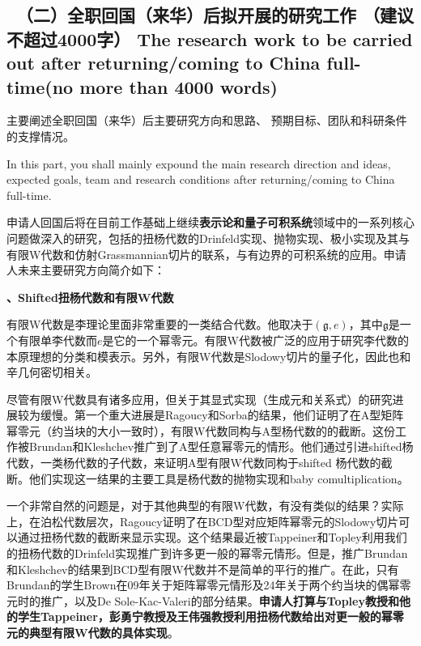 \documentclass[12pt,UTF8,AutoFakeBold=4,a4paper]{ctexart}
\begin{document}
{\color{MsBlue} \subsection{\sihao \kaishu \qquad \ 
\textbf{（二）全职回国（来华）后拟开展的研究工作} {\normalfont（建议不超过4000字）} 
\bfseries \xiaosihao {} 
The research work to 
be carried out after returning/coming to China full-time(no more than 4000 words)} 
}

 

{\sihao \color{MsBlue} \kaishu 主要阐述全职回国（来华）后主要研究方向和思路、
预期目标、团队和科研条件的支撑情况。}

\medskip

{\color{MsBlue}  
In this part, you shall mainly expound the main research direction and ideas, 
expected goals, team and research conditions after returning/coming to China 
full-time.}

\medskip

申请人回国后将在目前工作基础上继续\textbf{表示论和量子可积系统}领域中的一系列核心问题做深入的研究，包括的扭杨代数的Drinfeld实现、抛物实现、极小实现及其与有限W代数和仿射Grassmannian切片的联系，与有边界的可积系统的应用。申请人未来主要研究方向简介如下：

\textbf{、Shifted扭杨代数和有限W代数}

有限W代数是李理论里面非常重要的一类结合代数。他取决于$(\mathfrak g,e)$，其中$\mathfrak g$是一个有限单李代数而$e$是它的一个幂零元。有限W代数被广泛的应用于研究李代数的本原理想的分类和模表示。另外，有限W代数是Slodowy切片的量子化，因此也和辛几何密切相关。

尽管有限W代数具有诸多应用，但关于其显式实现（生成元和关系式）的研究进展较为缓慢。第一个重大进展是Ragoucy和Sorba的结果，他们证明了在A型矩阵幂零元（约当块的大小一致时），有限W代数同构与A型杨代数的的截断。这份工作被Brundan和Kleshchev推广到了A型任意幂零元的情形。他们通过引进shifted杨代数，一类杨代数的子代数，来证明A型有限W代数同构于shifted 杨代数的截断。他们实现这一结果的主要工具是杨代数的抛物实现和baby comultiplication。

一个非常自然的问题是，对于其他典型的有限W代数，有没有类似的结果？实际上，在泊松代数层次，Ragoucy证明了在BCD型对应矩阵幂零元的Slodowy切片可以通过扭杨代数的截断来显示实现。这个结果最近被Tappeiner和Topley利用我们的扭杨代数的Drinfeld实现推广到许多更一般的幂零元情形。但是，推广Brundan和Kleshchev的结果到BCD型有限W代数并不是简单的平行的推广。在此，只有Brundan的学生Brown在09年关于矩阵幂零元情形及24年关于两个约当块的偶幂零元时的推广，以及De Sole-Kac-Valeri的部分结果。\textbf{申请人打算与Topley教授和他的学生Tappeiner，彭勇宁教授及王伟强教授利用扭杨代数给出对更一般的幂零元的典型有限W代数的具体实现}。
\end{document}
